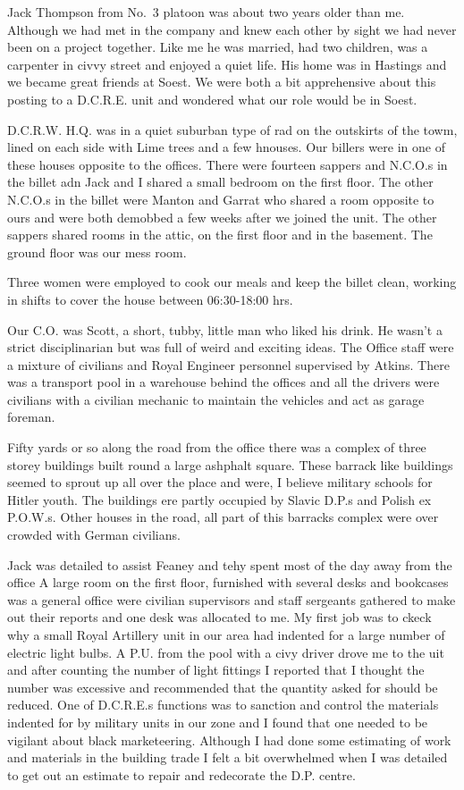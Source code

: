 Jack Thompson from No.~3 platoon was about two years older than
me. Although we had met in the company and knew each other by sight we
had never been on a project together. Like me he was married, had two
children, was a carpenter in civvy street and enjoyed a quiet
life. His home was in Hastings and we became great friends at
Soest. We were both a bit apprehensive about this posting to a
D.C.R.E. unit and wondered what our role would be in Soest.

D.C.R.W. H.Q. was in a quiet suburban type of rad on the outskirts of
the towm, lined on each side with Lime trees and a few hnouses. Our
billers were in one of these houses opposite to the offices. There
were fourteen sappers and N.C.O.s in the billet adn Jack and I shared
a small bedroom on the first floor. The other N.C.O.s in the billet
were \corporal Manton and \lcorporal Garrat who shared a room opposite to
ours and were both demobbed a few weeks after we joined the unit. The
other sappers shared rooms in the attic, on the first floor and in the
basement. The ground floor was our mess room.

Three women were employed to cook our meals and keep the billet clean,
working in shifts to cover the house between 06:30-18:00 hrs.

Our C.O. was \captain Scott, a short, tubby, little man who liked his
drink. He wasn't a strict disciplinarian but was full of weird and
exciting ideas. The Office staff were a mixture of civilians and Royal
Engineer personnel supervised by \sergeant Atkins. There was a transport
pool in a warehouse behind the offices and all the drivers were
civilians with a civilian mechanic to maintain the vehicles and act as
garage foreman.

Fifty yards or so along the road from the office there was a complex
of three storey buildings built round a large ashphalt square. These
barrack like buildings seemed to sprout up all over the place and
were, I believe military schools for Hitler youth. The buildings ere
partly occupied by Slavic D.P.s and Polish ex P.O.W.s. Other houses in
the road, all part of this barracks complex were over crowded with
German civilians.

Jack was detailed to assist \sergeant Feaney and tehy spent most of the
day away from the office A large room on the first floor, furnished
with several desks and bookcases was a general office were civilian
supervisors and staff sergeants gathered to make out their reports and
one desk was allocated to me. My first job was to ckeck why a small
Royal Artillery unit in our area had indented for a large number of
electric light bulbs. A P.U. from the pool with a civy driver drove me
to the uit and after counting the number of light fittings I reported
that I thought the number was excessive and recommended that the
quantity asked for should be reduced. One of D.C.R.E.s functions was
to sanction and control the materials indented for by military units
in our zone and I found that one needed to be vigilant about black
marketeering. Although I had done some estimating of work and
materials in the building trade I felt a bit overwhelmed when I was
detailed to get out an estimate to repair and redecorate the
D.P. centre.

